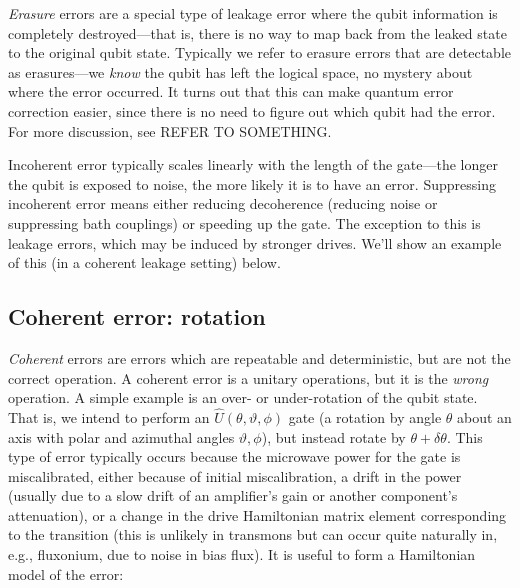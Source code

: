 \textit{Erasure} errors are a special type of leakage error where the qubit information is completely destroyed---that is, there is no way to map back from the leaked state to the original qubit state. Typically we refer to erasure errors that are detectable as erasures---we \textit{know} the qubit has left the logical space, no mystery about where the error occurred. It turns out that this can make quantum error correction easier, since there is no need to figure out which qubit had the error. For more discussion, see REFER TO SOMETHING.

Incoherent error typically scales linearly with the length of the gate---the longer the qubit is exposed to noise, the more likely it is to have an error. Suppressing incoherent error means either reducing decoherence (reducing noise or suppressing bath couplings) or speeding up the gate. The exception to this is leakage errors, which may be induced by stronger drives. We'll show an example of this (in a coherent leakage setting) below.

\subsection{Coherent error: rotation}
\textit{Coherent} errors are errors which are repeatable and deterministic, but are not the correct operation. A coherent error is a unitary operations, but it is the \textit{wrong} operation. A simple example is an over- or under-rotation of the qubit state. That is, we intend to perform an $\hat{U}(\theta,\vartheta,\phi)$ gate (a rotation by angle $\theta$ about an axis with polar and azimuthal angles $\vartheta,\phi$), but instead rotate by $\theta +\delta\theta$. This type of error typically occurs because the microwave power for the gate is miscalibrated, either because of initial miscalibration, a drift in the power (usually due to a slow drift of an amplifier's gain or another component's attenuation), or a change in the drive Hamiltonian matrix element corresponding to the transition (this is unlikely in transmons but can occur quite naturally in, e.g., fluxonium, due to noise in bias flux). It is useful to form a Hamiltonian model of the error: 

